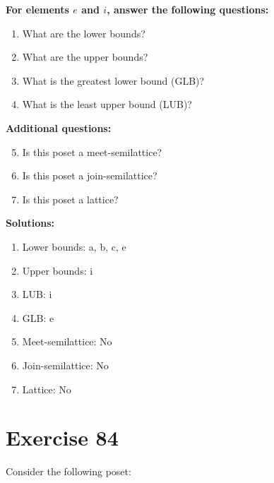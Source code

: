 \documentclass{article}
\begin{document}
    \textbf{For elements $e$ and $i$, answer the following questions:}
\begin{enumerate}
    \item What are the lower bounds?
    \item What are the upper bounds?
    \item What is the greatest lower bound (GLB)?
    \item What is the least upper bound (LUB)?
\end{enumerate}
    \hspace*{3ex} \textbf{Additional questions:}
\begin{enumerate}
    \setcounter{enumi}{4}
    \item Is this poset a meet-semilattice?
    \item Is this poset a join-semilattice?
    \item Is this poset a lattice?
\end{enumerate}

\textbf{Solutions:}
\begin{enumerate}
    \item Lower bounds: {a, b, c, e}
    \item Upper bounds: {i}
    \item LUB: i
    \item GLB: e
    \item Meet-semilattice: No
    \item Join-semilattice: No
    \item Lattice: No
\end{enumerate}
\newpage
\section*{Exercise 84}
Consider the following poset:
\begin{center}
\end{center}
\end{document}
